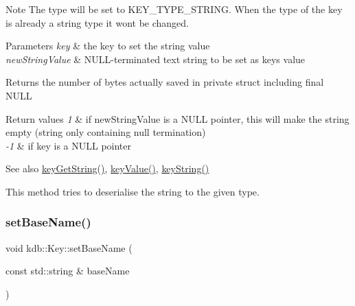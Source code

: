 \begin{DoxyNote}{Note}
The type will be set to K\+E\+Y\+\_\+\+T\+Y\+P\+E\+\_\+\+S\+T\+R\+I\+NG. When the type of the key is already a string type it won\textquotesingle{}t be changed.
\end{DoxyNote}

\begin{DoxyParams}{Parameters}
{\em key} & the key to set the string value \\
\hline
{\em new\+String\+Value} & N\+U\+L\+L-\/terminated text string to be set as {\ttfamily key\textquotesingle{}s} value \\
\hline
\end{DoxyParams}
\begin{DoxyReturn}{Returns}
the number of bytes actually saved in private struct including final N\+U\+LL 
\end{DoxyReturn}

\begin{DoxyRetVals}{Return values}
{\em 1} & if new\+String\+Value is a N\+U\+LL pointer, this will make the string empty (string only containing null termination) \\
\hline
{\em -\/1} & if key is a N\+U\+LL pointer \\
\hline
\end{DoxyRetVals}
\begin{DoxySeeAlso}{See also}
\mbox{\hyperlink{group__keyvalue_ga41b9fac5ccddafe407fc0ae1e2eb8778}{key\+Get\+String()}}, \mbox{\hyperlink{group__keyvalue_ga6f29609c5da53c6dc26a98678d5752af}{key\+Value()}}, \mbox{\hyperlink{group__keyvalue_ga880936f2481d28e6e2acbe7486a21d05}{key\+String()}}
\end{DoxySeeAlso}
This method tries to deserialise the string to the given type. \mbox{\label{classkdb_1_1Key_a0c8c7cef03d6482d89973be72fb3c8b8}} 
\subsubsection{\texorpdfstring{setBaseName()}{setBaseName()}}
{\footnotesize\ttfamily void kdb\+::\+Key\+::set\+Base\+Name (\begin{DoxyParamCaption}\item[{const std\+::string \&}]{base\+Name }\end{DoxyParamCaption})\hspace{0.3cm}{\ttfamily [inline]}}



